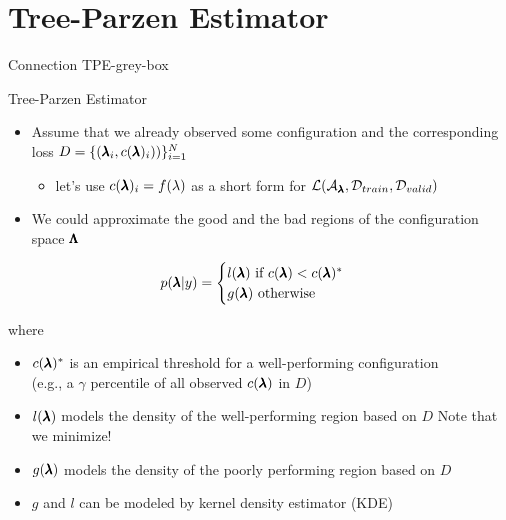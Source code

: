 \section{Tree-Parzen Estimator}
\begin{frame}[c]{Connection TPE-grey-box}


\end{frame}
\begin{frame}[c]{Tree-Parzen Estimator}

\begin{itemize}
	\item Assume that we already observed some configuration and the corresponding loss $D = \{(\pmb{\lambda}_i, c({\pmb{\lambda}})_i))\}_{i=1}^N$
	\begin{itemize}
		\item let's use $c({\pmb{\lambda}})_i = f(\lambda)$ as a short form for $\mathcal{L}(\mathcal{A}_{\pmb{\lambda}}, \mathcal{D}_{train}, \mathcal{D}_{valid})$
	\end{itemize}
	\pause
	\item We could approximate the good and the bad regions of the configuration space $\pmb{\Lambda}$
\end{itemize}

$$
p(\pmb{\lambda}|y) = \begin{cases}
l(\pmb{\lambda}) \text{ if } c({\pmb{\lambda}}) < c({\pmb{\lambda}})^*\\
g(\pmb{\lambda}) \text{ otherwise} 
\end{cases}
$$

where 
\begin{itemize}
	\item $c({\pmb{\lambda}})^*$ is an empirical threshold for a well-performing configuration\\ (e.g., a $\gamma$ percentile of all observed $c({\pmb{\lambda}})$ in $D$)
	\pause
	\item $l(\pmb{\lambda})$ models the density of the well-performing region based on $D$
\note[item] Note that we minimize!
	\pause
	\item $g(\pmb{\lambda})$ models the density of the poorly performing region based on $D$
	\pause
	\item $g$ and $l$ can be modeled by kernel density estimator (KDE)
\end{itemize}


\end{frame}
